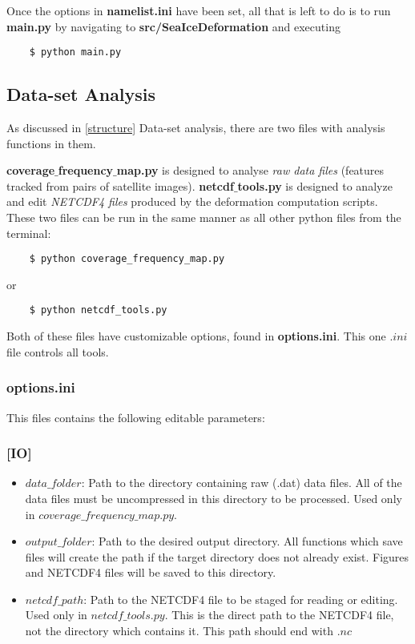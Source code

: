 \documentclass[12pt]{article}
\begin{document}
Once the options in \textbf{namelist.ini} have been set, all that is left to do is to run \textbf{main.py} by navigating to \textbf{src/SeaIceDeformation} and executing

\begin{verbatim}
    $ python main.py
\end{verbatim}

\subsection{Data-set Analysis}

As discussed in \ref{structure} Data-set analysis, there are two files with analysis functions in them. 

\textbf{coverage$\_$frequency$\_$map.py} is designed to analyse \textit{raw data files} (features tracked from pairs of satellite images). \textbf{netcdf$\_$tools.py} is designed to analyze and edit \textit{NETCDF4 files} produced by the deformation computation scripts. These two files can be run in the same manner as all other python files from the terminal:

\begin{verbatim}
    $ python coverage_frequency_map.py
\end{verbatim}

or 

\begin{verbatim}
    $ python netcdf_tools.py
\end{verbatim}

Both of these files have customizable options, found in \textbf{options.ini}. This one $.ini$ file controls all tools.

\subsubsection*{\textbf{options.ini}}
This files contains the following editable parameters:

\subsubsection*{[IO]}

\begin{itemize}
    \item $data\_folder$: Path to the directory containing raw (.dat) data files. All of the data files must be uncompressed in this directory to be processed. Used only in $coverage\_frequency\_map.py$.
    
    \item $output\_folder$: Path to the desired output directory. All functions which save files will create the path if the target directory does not already exist. Figures and NETCDF4 files will be saved to this directory.
    
    \item $netcdf\_path$: Path to the NETCDF4 file to be staged for reading or editing. Used only in $netcdf\_tools.py$. This is the direct path to the NETCDF4 file, not the directory which contains it. This path should end with $.nc$
\end{itemize}
\end{document}
